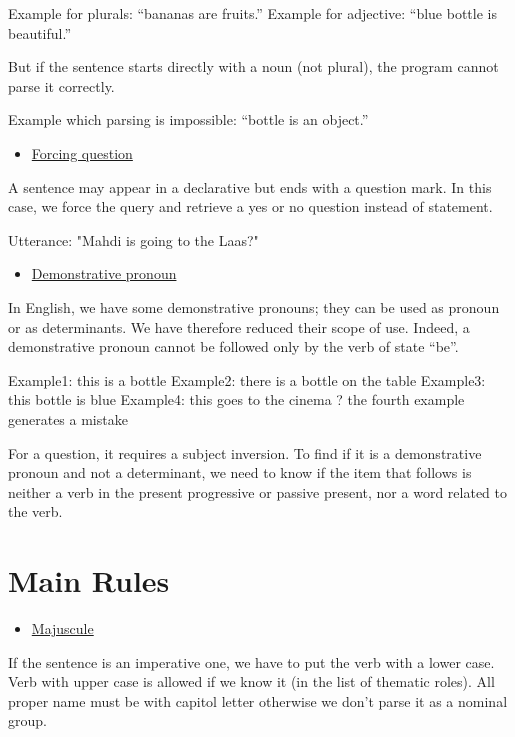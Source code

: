 \documentclass[twoside,a4paper,10pt]{report}
\newcommand{\dokutitleleveltwo}[1]{\chapter{#1}}
\newcommand{\dokuunderline}[1]{\underline{#1}}
\newcommand{\dokuitem}{\item}
\begin{document}
\small
\begin{verbatimtab}
  Example for plurals: “bananas are fruits.”
  Example for adjective: “blue bottle is beautiful.”
\end{verbatimtab}
\normalsize
But if the sentence starts directly with a noun (not plural), the program cannot parse it correctly.


\small
\begin{verbatimtab}
  Example which parsing is impossible: “bottle is an object.”
\end{verbatimtab}
\normalsize

\begin{itemize}
\dokuitem  \dokuunderline{Forcing question}
\end{itemize}
A sentence may appear in a declarative but ends with a question mark. In this case, we force the query and retrieve a yes or no question instead of statement.


\small
\begin{verbatimtab}
  Utterance: "Mahdi is going to the Laas?"
\end{verbatimtab}
\normalsize

\begin{itemize}
\dokuitem  \dokuunderline{Demonstrative pronoun}
\end{itemize}
In English, we have some demonstrative pronouns; they can be used as pronoun or as determinants. We have therefore reduced their scope of use. Indeed, a demonstrative pronoun cannot be followed only by the verb of state “be”.


\small
\begin{verbatimtab}
  Example1: this is a bottle
  Example2: there is a bottle on the table
  Example3: this bottle is blue
  Example4: this goes to the cinema 
  ? the fourth example generates a mistake
\end{verbatimtab}
\normalsize
For a question, it requires a subject inversion. To find if it is a demonstrative pronoun and not a determinant, we need to know if the item that follows is neither a verb in the present progressive or passive present, nor a word related to the verb.


\dokutitleleveltwo{Main Rules}
\label{a29295e0e06fd34b31fb0a5367730e7f}%

\begin{itemize}
\dokuitem  \dokuunderline{Majuscule}
\end{itemize}
If the sentence is an imperative one, we have to put the verb with a lower case. Verb with upper case is allowed if we know it (in the list of thematic roles). All proper name must be with capitol letter otherwise we don’t parse it as a nominal group.
\end{document}
